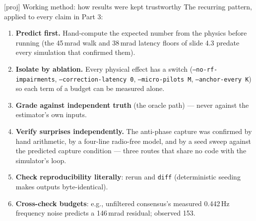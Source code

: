 \documentclass[10pt]{beamer}
\newcommand{\code}[1]{\texttt{#1}}
\newcommand{\proj}[1]{\textcolor{green!35!black}{[proj#1]}}
\newcommand{\srcline}[1]{\par\vfill\noindent{\tiny\textcolor{gray}{Source: #1}}}
\begin{document}
\begin{frame}{\proj{} Working method: how results were kept trustworthy}
The recurring pattern, applied to every claim in Part 3:
\begin{enumerate}
\item \textbf{Predict first.} Hand-compute the expected number from the
physics before running (the 45\,mrad walk and 38\,mrad latency floors
of slide 4.3 predate every simulation that confirmed them).
\item \textbf{Isolate by ablation.} Every physical effect has a switch
(\code{--no-rf-impairments}, \code{--correction-latency 0},
\code{--micro-pilots M}, \code{--anchor-every K}) so each term of a
budget can be measured alone.
\item \textbf{Grade against independent truth} (the oracle path) ---
never against the estimator's own inputs.
\item \textbf{Verify surprises independently.} The anti-phase capture
was confirmed by hand arithmetic, by a four-line radio-free model, and
by a seed sweep against the predicted capture condition --- three
routes that share no code with the simulator's loop.
\item \textbf{Check reproducibility literally}: rerun and \code{diff}
(deterministic seeding makes outputs byte-identical).
\item \textbf{Cross-check budgets}: e.g., unfiltered consensus's
measured 0.442\,Hz frequency noise predicts a 146\,mrad residual;
observed 153.
\end{enumerate}
\srcline{The same discipline explains the one thing simulation cannot supply: hardware validation (open item).}
\end{frame}
\end{document}
